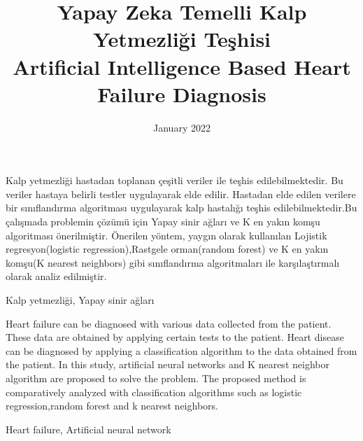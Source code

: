 \documentclass[conference]{IEEEtran}
\begin{document}
\large

\title{Yapay Zeka Temelli Kalp Yetmezliği Teşhisi\\
Artificial Intelligence Based Heart Failure Diagnosis
}

\author{
\and
{}
}
\date{January 2022}
\maketitle
\begin{ozet}
Kalp yetmezliği hastadan toplanan çeşitli veriler ile  teşhis edilebilmektedir. Bu veriler hastaya belirli testler uygulayarak elde edilir. Hastadan elde edilen verilere bir sınıflandırma algoritması uygulayarak kalp hastalığı teşhis edilebilmektedir.Bu çalışmada problemin çözümü için Yapay sinir ağları ve K en yakın komşu algoritması önerilmiştir. Önerilen yöntem, yaygın olarak kullanılan  Lojistik regresyon(logistic regression),Rastgele orman(random forest) ve K en yakın komşu(K nearest neighbors) gibi sınıflandırma algoritmaları ile karşılaştırmalı olarak analiz edilmiştir.\\
\end{ozet}
\begin{keywordss}
Kalp yetmezliği, Yapay sinir ağları\\
\end{keywordss}

\begin{abstracts}
Heart failure can be diagnosed with various data collected from the patient. These data are obtained by applying certain tests to the patient. Heart disease can be diagnosed by applying a classification algorithm to the data obtained from the patient. In this study, artificial neural networks and K nearest neighbor algorithm are proposed to solve the problem. The proposed method is comparatively analyzed with classification algorithms such as logistic regression,random forest and k nearest neighbors.\\
\end{abstracts}
\begin{keyword}
Heart failure, Artificial neural network
\end{keyword}
\end{document}
